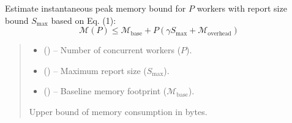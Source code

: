 \documentclass[a4paper,11pt,english,openany,oneside]{sphinxmanual}
\begin{document}
\begin{fulllineitems}
\begin{fulllineitems}
\label{\detokenize{modules/core:core.resource_manager.MemoryEstimator.estimate_memory_bound}}
\pysigstartsignatures
\pysiglinewithargsret
{}
{\sphinxparamcomma {}\sphinxparamcomma {}}
{}
\pysigstopsignatures
\sphinxAtStartPar
Estimate instantaneous peak memory bound for $P$ workers with report size bound $S_{\max}$ based on Eq. (1):
\begin{equation*}
\mathcal{M}(P) \le \mathcal{M}_{\mathrm{base}} + P\left(\gamma S_{\max} + \mathcal{M}_{\mathrm{overhead}}\right)
\end{equation*}
\begin{quote}\begin{description}
\begin{itemize}
\item {} 
\sphinxAtStartPar
{} () – Number of concurrent workers ($P$).

\item {} 
\sphinxAtStartPar
{} () – Maximum report size ($S_{\max}$).

\item {} 
\sphinxAtStartPar
{} () – Baseline memory footprint ($\mathcal{M}_{\mathrm{base}}$).

\end{itemize}

\sphinxAtStartPar
Upper bound of memory consumption in bytes.

\sphinxAtStartPar
{}

\end{description}\end{quote}

\end{fulllineitems}


\end{fulllineitems}
\end{document}
